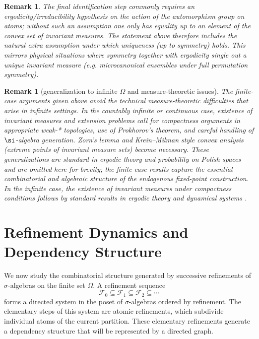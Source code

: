 \documentclass[
 amsmath,amssymb,
  onecolumn %
]{revtex4-2}
\newtheorem{remark}[theorem]{Remark}
\begin{document}
\begin{remark} The final identification step commonly requires an ergodicity/irreducibility hypothesis on the action of the automorphism group on atoms; without such an assumption one only has equality up to an element of the convex set of invariant measures. The statement above therefore includes the natural extra assumption under which uniqueness (up to symmetry) holds. This mirrors physical situations where symmetry together with ergodicity single out a unique invariant measure (e.g. microcanonical ensembles under full permutation symmetry).
\end{remark} 

\begin{remark}[generalization to infinite $\Omega$ and measure-theoretic issues]
The finite-case arguments given above avoid the technical
measure-theoretic difficulties that arise in infinite settings. In the countably infinite or continuous case, existence of invariant measures and extension problems call for compactness arguments in appropriate weak-* topologies, use of Prokhorov’s theorem, and careful handling of $\si$-algebra generation. Zorn’s lemma and Krein–Milman style convex analysis (extreme points of invariant measure sets) become necessary. These generalizations are standard in ergodic theory and probability on Polish spaces and are omitted here for brevity; the finite-case results capture the essential combinatorial and algebraic structure
of the endogenous fixed-point construction. In the infinite case, the existence of invariant measures under compactness conditions follows by standard results in ergodic theory and dynamical systems \cite{BK, P}.
\end{remark} 




\section{Refinement Dynamics and Dependency Structure}\label{sec4}
We now study the combinatorial structure generated by successive
refinements of $\sigma$-algebras on the finite set $\Omega$.
A refinement sequence
\[
\mathcal F_0 \subseteq \mathcal F_1 \subseteq \mathcal F_2 \subseteq \cdots
\]
forms a directed system in the poset of $\sigma$-algebras ordered by
refinement.
The elementary steps of this system are atomic refinements,
which subdivide individual atoms of the current partition.
These elementary refinements generate a dependency structure
that will be represented by a directed graph.
\end{document}
